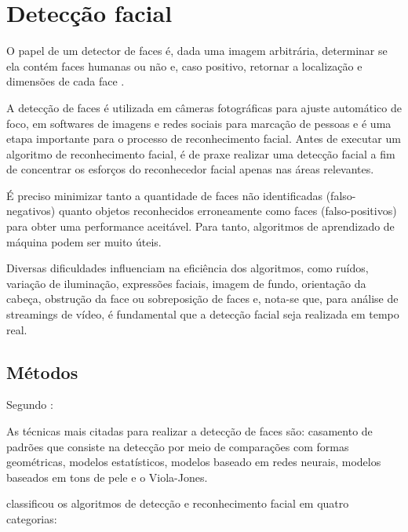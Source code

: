 \chapter{Detecção facial}\label{cap:detecao_facial}


O papel de um detector de faces é, dada uma imagem arbitrária, determinar se ela contém faces humanas ou não e, caso positivo, retornar a localização e dimensões de cada face \cite{censtudy}.

A detecção de faces é utilizada em câmeras fotográficas para ajuste automático de foco, em softwares de imagens e redes sociais para marcação de pessoas e é uma etapa importante para o processo de reconhecimento facial. Antes de executar um algoritmo de reconhecimento facial, é de praxe realizar uma detecção facial a fim de concentrar os esforços do reconhecedor facial apenas nas áreas relevantes.

É preciso minimizar tanto a quantidade de faces não identificadas (falso-negativos) quanto objetos reconhecidos erroneamente como faces (falso-positivos) para obter uma performance aceitável. Para tanto, algoritmos de aprendizado de máquina podem ser muito úteis.

Diversas dificuldades influenciam na eficiência dos algoritmos, como ruídos, variação de iluminação, expressões faciais, imagem de fundo, orientação da cabeça, obstrução da face ou sobreposição de faces \cite{de2015processo} e, nota-se que, para análise de streamings de vídeo, é fundamental que a detecção facial seja realizada em tempo real.

\section{Métodos}

Segundo :

\begin{citacao}
As técnicas mais citadas para realizar a detecção de faces são: casamento de padrões que consiste na detecção por meio de comparações com formas geométricas, modelos estatísticos, modelos baseado em redes neurais, modelos baseados em tons de pele e o Viola-Jones.
\end{citacao}

 classificou os algoritmos de detecção e reconhecimento facial em quatro categorias:


